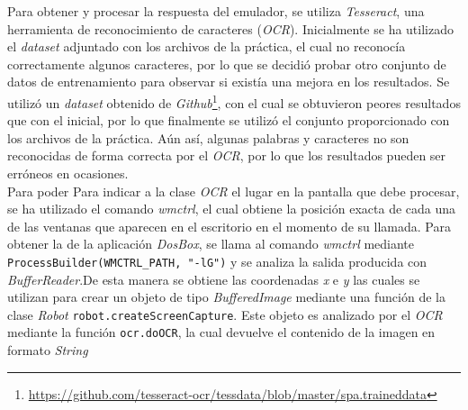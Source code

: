 \documentclass[10pt,a4paper]{article}
\begin{document}
Para obtener y procesar la respuesta del emulador, se utiliza \textit{Tesseract}, una herramienta de reconocimiento de caracteres (\textit{OCR}). Inicialmente se ha utilizado el \textit{dataset} adjuntado con los archivos de la práctica, el cual no reconocía correctamente algunos caracteres, por lo que se decidió probar otro conjunto de datos de entrenamiento para observar si existía una mejora en los resultados. Se utilizó un \textit{dataset} obtenido de \textit{Github}\footnote{\url{https://github.com/tesseract-ocr/tessdata/blob/master/spa.traineddata}}, con el cual se obtuvieron peores resultados que con el inicial, por lo que finalmente se utilizó el conjunto proporcionado con los archivos de la práctica. Aún así, algunas palabras y caracteres no son reconocidas de forma correcta por el \textit{OCR}, por lo que los resultados pueden ser erróneos en ocasiones. \\
Para poder Para indicar a la clase \textit{OCR} el lugar en la pantalla que debe procesar, se ha utilizado el comando \textit{wmctrl}, el cual obtiene la posición exacta de cada una de las ventanas que aparecen en el escritorio en el momento de su llamada. Para obtener la de la aplicación \textit{DosBox}, se llama al comando \textit{wmctrl} mediante \texttt{ProcessBuilder(WMCTRL\_PATH, "-lG")} y se analiza la salida producida con \textit{BufferReader}.De esta manera se obtiene las coordenadas \textit{x} e \textit{y} las cuales se utilizan para crear un objeto de tipo \textit{BufferedImage} mediante una función de la clase \textit{Robot} \texttt{robot.createScreenCapture}. Este objeto es analizado por el \textit{OCR} mediante la función \texttt{ocr.doOCR}, la cual devuelve el contenido de la imagen en formato \textit{String}\\
\end{document}
